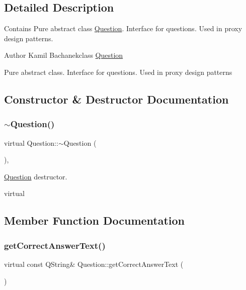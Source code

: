 \subsection{Detailed Description}
Contains Pure abstract class \hyperlink{class_question}{Question}. Interface for questions. Used in proxy design patterns. 

\begin{DoxyAuthor}{Author}
Kamil Bachanekclass \hyperlink{class_question}{Question}
\end{DoxyAuthor}
Pure abstract class. Interface for questions. Used in proxy design patterns 

\subsection{Constructor \& Destructor Documentation}
\mbox{\label{class_question_a0841b4ac227eb40d2d2f0d3449ca12d1}} 
\subsubsection{\texorpdfstring{$\sim$\+Question()}{~Question()}}
{\footnotesize\ttfamily virtual Question\+::$\sim$\+Question (\begin{DoxyParamCaption}{ }\end{DoxyParamCaption})\hspace{0.3cm}{\ttfamily [inline]}, {\ttfamily [virtual]}}



\hyperlink{class_question}{Question} destructor. 

virtual 

\subsection{Member Function Documentation}
\mbox{\label{class_question_a3c825d4c813d2d620c46b062aef1c364}} 
\subsubsection{\texorpdfstring{get\+Correct\+Answer\+Text()}{getCorrectAnswerText()}}
{\footnotesize\ttfamily virtual const Q\+String\& Question\+::get\+Correct\+Answer\+Text (\begin{DoxyParamCaption}{ }\end{DoxyParamCaption})\hspace{0.3cm}{\ttfamily [pure virtual]}}



